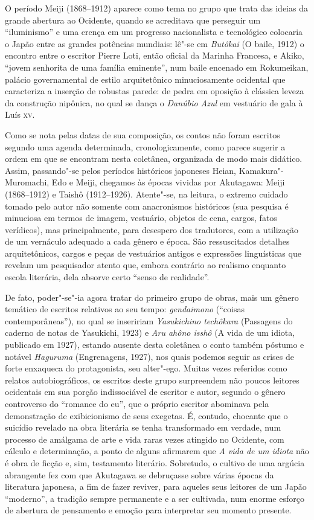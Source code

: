 O período Meiji (1868--1912) aparece como tema no grupo que trata das
ideias da grande abertura ao Ocidente, quando se acreditava que
perseguir um ``iluminismo'' e uma crença em um progresso nacionalista e
tecnológico colocaria o Japão entre as grandes potências mundiais:
lê"-se em \textit{Butôkai} (O baile, 1912) o encontro entre
o escritor Pierre Loti, então oficial da Marinha Francesa, e Akiko,
``jovem senhorita de uma família eminente'', num baile encenado em
Rokumeikan, palácio governamental de estilo arquitetônico
minuciosamente ocidental que caracteriza a inserção de robustas parede:
de pedra em oposição à clássica leveza da construção nipônica, no qual
se dança o \textit{Danúbio Azul} em vestuário de gala à Luís \textsc{xv}.

Como se nota pelas datas de sua composição, os contos não foram escritos
segundo uma agenda determinada, cronologicamente, como parece sugerir a
ordem em que se encontram nesta coletânea, organizada de modo mais
didático. Assim, passando"-se pelos períodos históricos japoneses Heian,
Kamakura"-Muromachi, Edo e Meiji, chegamos às épocas vividas por
Akutagawa: Meiji (1868--1912) e Taishô (1912--1926). Atente"-se, na
leitura, o extremo cuidado tomado pelo autor não somente com
anacronismos históricos (sua pesquisa é minuciosa em termos de imagem,
vestuário, objetos de cena, cargos, fatos verídicos), mas 
principalmente, para desespero dos tradutores, com a utilização de um
vernáculo adequado a cada gênero e época. São ressuscitados detalhes
arquitetônicos, cargos e peças de vestuários antigos e expressões
linguísticas que revelam um pesquisador atento que, embora contrário ao
realismo enquanto escola literária, dela absorve certo ``senso de realidade''.

De fato, poder"-se"-ia agora tratar do primeiro grupo de obras, mais um 
gênero temático de escritos relativos ao seu tempo: \textit{gendaimono} 
(``coisas contemporâneas''), no qual se inseririam
\textit{Yasukichino techôkara} (Passagens do caderno de notas de Yasukichi, 
1923) e \textit{Aru ahôno isshô} (A vida de um idiota, publicado em 1927), 
estando ausente desta coletânea o conto também póstumo e notável \textit{Haguruma} 
(Engrenagens, 1927), nos quais podemos seguir as crises de
forte enxaqueca do protagonista, seu alter"-ego. Muitas vezes referidos como
relatos autobiográficos, os escritos deste grupo surpreendem não poucos
leitores ocidentais em sua porção indissociável de escritor e autor,
segundo o gênero controverso do ``romance do eu'', que o próprio
escritor abominava pela demonstração de exibicionismo de seus exegetas.
 É, contudo, chocante que o suicídio revelado na obra literária se
tenha transformado em verdade, num processo de amálgama de arte e vida
raras vezes atingido no Ocidente, com cálculo e determinação, a ponto
de alguns afirmarem que \textit{A vida de um idiota} não é obra de ficção e,
sim, testamento literário. Sobretudo, o cultivo de uma argúcia
abrangente fez com que Akutagawa se debruçasse sobre várias épocas da
literatura japonesa, a fim de fazer reviver, para aqueles seus leitores
de um Japão ``moderno'', a tradição sempre permanente e a ser cultivada,
num enorme esforço de abertura de pensamento e emoção para interpretar
seu momento presente.

